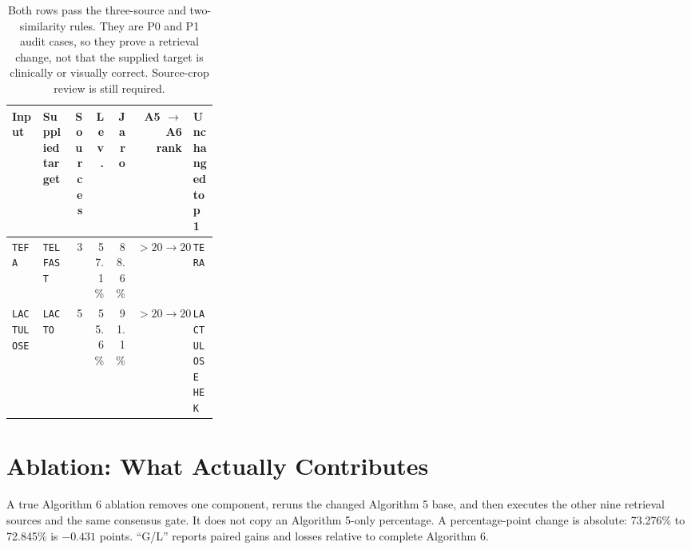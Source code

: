 \documentclass[11pt]{article}
\newcommand{\code}[1]{\texttt{#1}}
\begin{document}
\begin{table}[htbp]
\centering
\small
\begin{tabularx}{\linewidth}{@{}L{0.15\linewidth}L{0.15\linewidth}rrrrY@{}}
\toprule
\textbf{Input} & \textbf{Supplied target} & \textbf{Sources} & \textbf{Lev.} & \textbf{Jaro} & \textbf{A5 $\rightarrow$ A6 rank} & \textbf{Unchanged top 1} \\
\midrule
\code{TEFA} & \code{TELFAST} & 3 & 57.1\% & 88.6\% & $>20\rightarrow20$ & \code{TERA} \\
\code{LACTULOSE} & \code{LACTO} & 5 & 55.6\% & 91.1\% & $>20\rightarrow20$ & \code{LACTULOSE HEK} \\
\bottomrule
\end{tabularx}
\caption{Both rows pass the three-source and two-similarity rules. They are P0
and P1 audit cases, so they prove a retrieval change, not that the supplied
target is clinically or visually correct. Source-crop review is still required.}
\label{tab:gain-examples}
\end{table}

\FloatBarrier
\section{Ablation: What Actually Contributes}

A true Algorithm 6 ablation removes one component, reruns the changed Algorithm
5 base, and then executes the other nine retrieval sources and the same
consensus gate. It does not copy an Algorithm 5-only percentage. A
percentage-point change is absolute: 73.276\% to 72.845\% is $-0.431$ points.
``G/L'' reports paired gains and losses relative to complete Algorithm 6.
\end{document}
